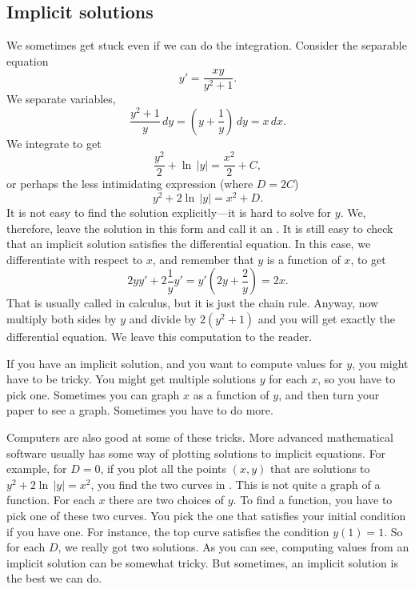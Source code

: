 \subsection{Implicit solutions}

We sometimes get stuck even if we can do the
integration.  Consider the separable equation
\begin{equation*}
y' = \frac{xy}{y^2+1} .
\end{equation*}
We separate variables,
\begin{equation*}
\frac{y^2+1}{y}\,dy = \left(y+\frac{1}{y}\right)\,dy = x\,dx .
\end{equation*}
We integrate to get
\begin{equation*}
\frac{y^2}{2} + \ln \, \lvert y \rvert = \frac{x^2}{2} + C ,
\end{equation*}
or perhaps the less intimidating expression (where $D = 2C$)
\begin{equation*}
y^2 + 2 \ln \, \lvert y\rvert = x^2 + D .
\end{equation*}
It is not easy to find the solution explicitly---it is hard to solve
for $y$.  We, therefore, leave the solution in this form and call
it an
\emph{}.
It is still
easy to check that an implicit solution satisfies the differential
equation.  In this case, we differentiate with respect to $x$, and remember
that $y$ is a function of $x$,
to get
\begin{equation*}
2y y' + 2 \frac{1}{y} y'
=
y'\left(2y + \frac{2}{y}\right) = 2x .
\end{equation*}
That is usually called  in calculus,
but it is just the chain rule.
Anyway, now
multiply both sides by $y$ and divide by $2(y^2+1)$ and you will
get exactly the differential equation.  We leave this computation to the
reader.

If you have an implicit solution, and
you want to compute values
for $y$, you might have to be tricky.  You might get multiple solutions $y$
for each $x$, so you have to pick one.  Sometimes you can
graph $x$ as a function of $y$, and then turn your paper to
see a graph.
Sometimes you have to do more.

Computers are also good at some of these tricks.
More advanced mathematical software usually has some
way of plotting solutions to implicit equations.
For example, for $D=0$, if you plot all the points $(x,y)$ that
are solutions to $y^2+2\ln \, \lvert y\rvert=x^2$,
you find the two curves in .  This is not quite
a graph of a function. For each $x$ there are two choices of $y$.
To find a function, you have to pick one of these two curves.
You pick the one that satisfies your initial condition if you have one.
For instance, the top curve satisfies the condition $y(1)=1$.
So for each $D$, we really got two solutions.
As you can see, computing values from an implicit solution can be somewhat
tricky.  But sometimes, an implicit solution is the best we can do.

